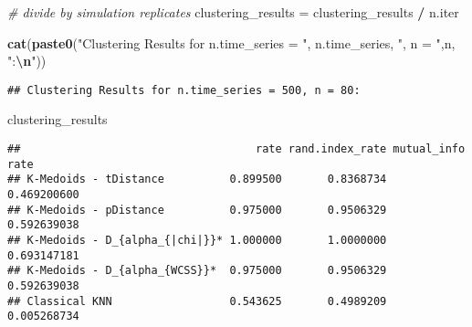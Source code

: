 \documentclass[
]{article}
\newenvironment{Shaded}{\begin{snugshade}}{\end{snugshade}}
\newcommand{\CommentTok}[1]{\textcolor[rgb]{0.56,0.35,0.01}{\textit{#1}}}
\newcommand{\FunctionTok}[1]{\textcolor[rgb]{0.13,0.29,0.53}{\textbf{#1}}}
\newcommand{\NormalTok}[1]{#1}
\newcommand{\OtherTok}[1]{\textcolor[rgb]{0.56,0.35,0.01}{#1}}
\newcommand{\SpecialCharTok}[1]{\textcolor[rgb]{0.81,0.36,0.00}{\textbf{#1}}}
\newcommand{\StringTok}[1]{\textcolor[rgb]{0.31,0.60,0.02}{#1}}
\begin{document}
\begin{Shaded}
\begin{Highlighting}[]
\CommentTok{\# divide by simulation replicates }
\NormalTok{clustering\_results }\OtherTok{=}\NormalTok{ clustering\_results }\SpecialCharTok{/}\NormalTok{ n.iter}

\FunctionTok{cat}\NormalTok{(}\FunctionTok{paste0}\NormalTok{(}\StringTok{"Clustering Results for n.time\_series = "}\NormalTok{, n.time\_series, }\StringTok{", n = "}\NormalTok{,n, }\StringTok{":}\SpecialCharTok{\textbackslash{}n}\StringTok{"}\NormalTok{))}
\end{Highlighting}
\end{Shaded}

\begin{verbatim}
## Clustering Results for n.time_series = 500, n = 80:
\end{verbatim}

\begin{Shaded}
\begin{Highlighting}[]
\NormalTok{clustering\_results }
\end{Highlighting}
\end{Shaded}

\begin{verbatim}
##                                    rate rand.index_rate mutual_info rate
## K-Medoids - tDistance          0.899500       0.8368734      0.469200600
## K-Medoids - pDistance          0.975000       0.9506329      0.592639038
## K-Medoids - D_{alpha_{|chi|}}* 1.000000       1.0000000      0.693147181
## K-Medoids - D_{alpha_{WCSS}}*  0.975000       0.9506329      0.592639038
## Classical KNN                  0.543625       0.4989209      0.005268734
\end{verbatim}
\end{document}
